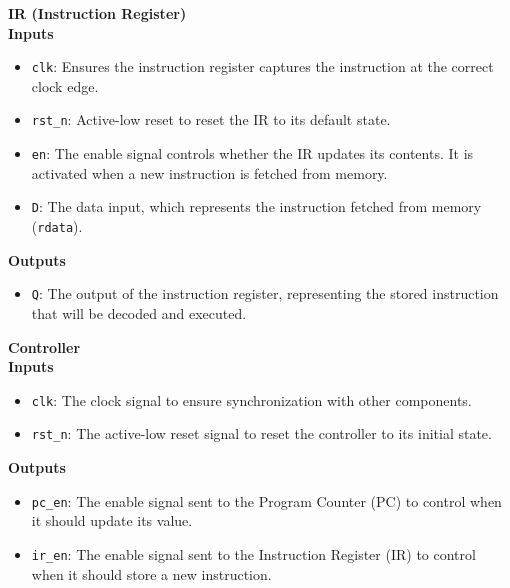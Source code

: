\hfill
\vline
\hfill
\begin{minipage}[t]{0.3\textwidth}
    \footnotesize
    \textbf{IR (Instruction Register)} \\ \vspace*{5px}
       \textbf{Inputs}
        \begin{itemize}
            \item \texttt{clk}: Ensures the instruction register captures the instruction at the correct clock edge.
            \item \texttt{rst\_n}: Active-low reset to reset the IR to its default state.
            \item \texttt{en}: The enable signal controls whether the IR updates its contents. It is activated when a new instruction is fetched from memory.
            \item \texttt{D}: The data input, which represents the instruction fetched from memory (\texttt{rdata}).
        \end{itemize}
        \textbf{Outputs}
        \begin{itemize}
            \item \texttt{Q}: The output of the instruction register, representing the stored instruction that will be decoded and executed.
        \end{itemize}

\end{minipage}
\hfill
\vline
\hfill
\begin{minipage}[t]{0.3\textwidth}
    \footnotesize
    \textbf{Controller} \\ \vspace*{5px}
        \textbf{Inputs}
        \begin{itemize}
            \item \texttt{clk}: The clock signal to ensure synchronization with other components.
            \item \texttt{rst\_n}: The active-low reset signal to reset the controller to its initial state.
        \end{itemize}
        \textbf{Outputs}
        \begin{itemize}
            \item \texttt{pc\_en}: The enable signal sent to the Program Counter (PC) to control when it should update its value.
            \item \texttt{ir\_en}: The enable signal sent to the Instruction Register (IR) to control when it should store a new instruction.
        \end{itemize}
\end{minipage}
\newpage
